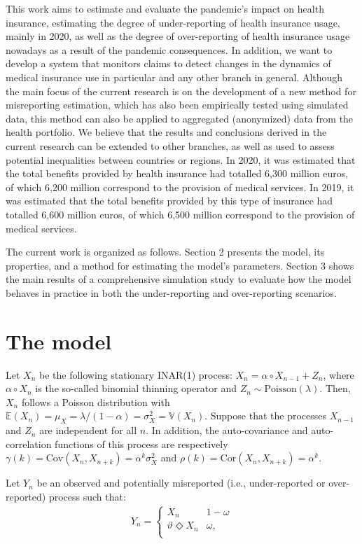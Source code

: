 \documentclass[Afour,sageh,times]{sagej}
\begin{document}
This work aims to estimate and evaluate the pandemic's impact on health insurance, estimating the degree of under-reporting of health insurance usage, mainly in 2020, as well as the degree of over-reporting of health insurance usage nowadays as a result of the pandemic consequences. In addition, we want to develop a system that monitors claims to detect changes in the dynamics of medical insurance use in particular and any other branch in general. Although the main focus of the current research is on the development of a new method for misreporting estimation, which has also been empirically tested using simulated data, this method can also be applied to aggregated (anonymized) data from the health portfolio. We believe that the results and conclusions derived in the current research can be extended to other branches, as well as used to assess potential inequalities between countries or regions. In 2020, it was estimated that the total benefits provided by health insurance had totalled 6,300 million euros, of which 6,200 million correspond to the provision of medical services. In 2019, it was estimated that the total benefits provided by this type of insurance had totalled 6,600 million euros, of which 6,500 million correspond to the provision of medical services.

The current work is organized as follows. Section 2 presents the model, its properties, and a method for estimating the model's parameters. Section 3 shows the main results of a comprehensive simulation study to evaluate how the model behaves in practice in both the under-reporting and over-reporting scenarios. 

\section{The model}

\noindent Let $X_n$ be the following stationary INAR(1) process: $X_n=\alpha\circ X_{n-1}+Z_n$, where $\alpha \circ X_n$ is the so-called binomial thinning operator and $Z_n \sim \textrm{Poisson}(\lambda)$. Then, $X_n$ follows a Poisson distribution with $\mathbb{E}(X_n)=\mu_X=\lambda/(1-\alpha)=\sigma_X^2=\mathbb{V}(X_n)$. Suppose that the processes $X_{n-1}$ and $Z_n$ are independent for all $n$. In addition, the auto-covariance and auto-correlation functions of this process are respectively $\gamma(k)=\textrm{Cov}(X_n,X_{n+k})=\alpha^k \sigma_X^2$ and $\rho(k)=\textrm{Cor}(X_n,X_{n+k})=\alpha^k$. 

Let $Y_n$ be an observed and potentially misreported (i.e., under-reported or over-reported) process such that:
\begin{align}\label{eq0:modelfatthin}
Y_n=\begin{cases} 
X_n &  1-\omega \\
\vartheta \Diamond X_n & \omega, \\
\end{cases}
\end{align}
\end{document}
